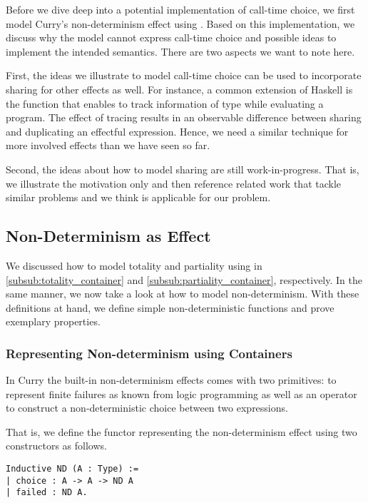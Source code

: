 Before we dive deep into a potential implementation of call-time choice, we first model Curry's non-determinism effect using
.
Based on this implementation, we discuss why the model cannot express call-time choice and possible ideas to implement the intended semantics. There are two aspects we want to note here.

First, the ideas we illustrate to model call-time choice can be used to incorporate sharing for other effects as well.
For instance, a common extension of Haskell is the function  that enables to track information of type  while evaluating a program.
The effect of tracing results in an observable difference between sharing and duplicating an effectful expression.
Hence, we need a similar technique for more involved effects than we have seen so far.

Second, the ideas about how to model sharing are still work-in-progress.
That is, we illustrate the motivation only and then reference related work that tackle similar problems and we think is applicable for our problem.

\subsection{Non-Determinism as Effect}

We discussed how to model totality and partiality using  in \autoref{subsub:totality_container} and \autoref{subsub:partiality_container}, respectively.
In the same manner, we now take a look at how to model non-determinism.
With these definitions at hand, we define simple non-deterministic functions and prove exemplary properties.

\subsubsection{Representing Non-determinism using Containers}
In Curry the built-in non-determinism effects comes with two primitives:  to represent finite failures as known from logic programming as well as an operator  to construct a non-deterministic choice between two expressions.

That is, we define the functor representing the non-determinism effect using two constructors as follows. 

\begin{verbatim}
Inductive ND (A : Type) :=
| choice : A -> A -> ND A
| failed : ND A.
\end{verbatim}

